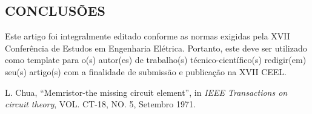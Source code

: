 \documentclass{ceel}
\begin{document}
\begin{multicols}{2}

\section{CONCLUSÕES}
Este artigo foi integralmente editado conforme as normas exigidas pela XVII Conferência de Estudos em Engenharia Elétrica. Portanto, este deve ser utilizado como template para o(s) autor(es) de trabalho(s) técnico-científico(s) redigir(em) seu(s) artigo(s) com a finalidade de submissão e publicação na XVII CEEL.

\begin{thebibliography}{9} %

    L. Chua,
    “Memristor-the missing circuit element”, 
    in \emph{IEEE Transactions on circuit theory}, VOL. CT-18, NO. 5, Setembro 1971.
   
\end{thebibliography}

\end{multicols}
\end{document}
